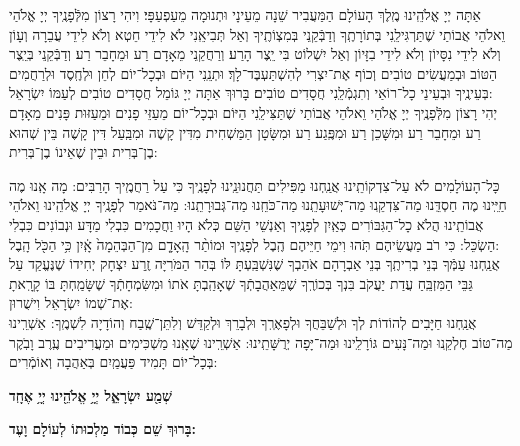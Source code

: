 \documentclass[twoside, openany, parskip=half, 11pt]{book}
\begin{document}
אַתָּה יְיָ  אֱלֹהֵֽינוּ מֶֽלֶךְ הָעוֹלָם הַמַּעֲבִיר שֵׁנָה מֵעֵינָי וּתְנוּמָה מֵעַפְעַפָּי׃ וִיהִי רָצוֹן מִלְּֿפָנֶֽיךָ יְיָ אֱלֹהַי וֵאלֹהֵי אֲבוֹתַי שֶׁתַּרְגִּילֵֽנִי בְּתוֹרָתֶֽךָ וְדַבְּֿקֵֽנִי בְּמִצְוֹתֶֽיךָ וְאַל תְּבִיאֵֽנִי לֹא לִידֵי חֵטְא וְלֹא לִידֵי עֲבֵרָה וְעָוֹן וְלֹא לִידֵי נִסָּיוֹן וְלֹא לִידֵי בִזָּיוֹן וְאַל יִשְׁלוֹט בִּי יֵֽצֶר הָרַע׃ וְרַחֲקֵֽנִי מֵאָדָם רַע וּמֵחָבֵר רַע׃ וְדַבְּֿקֵֽנִי בְּיֵֽצֶר הַטּוֹב וּבְמַעֲשִׂים טוֹבִים וְכוֹף אֶת־יִצְרִי לְהִשְׁתַּעְבֶּד־לָךְ׃ וּתְנֵֽנִי הַיּוֹם וּבְכָל־יוֹם לְחֵן וּלְחֶֽסֶד וּלְרַחֲמִים בְּעֵינֶֽיךָ וּבְעֵינֵי כָל־רוֹאַי וְתִגְמְֿלֵֽנִי חֲסָדִים טוֹבִים׃ בָּרוּךְ אַתָּה יְיָ  גּוֹמֵל חֲסָדִים טוֹבִים לְעַמּוֹ יִשְׂרָאֵל:\\
יְהִי רָצוֹן מִלְּֿפָנֶֽיךָ יְיָ אֱלֹהַי וֵאלֹהֵי אֲבוֹתַי שֶׁתַּצִּילֵֽנִי הַיּוֹם וּבְכָל־יוֹם מֵעַזֵּי פָנִים וּמֵעַזּוּת פָּנִים מֵאָדָם רַע וּמֵחָבֵר רַע וּמִשָּׁכֵן רַע וּמִפֶּֽגַע רַע וּמִשָּׂטָן הַמַּשְׁחִית מִדִּין קָשֶׁה וּמִבַּֽעַל דִּין קָשֶׁה בֵּין שְׁהוּא בֶן־בְּרִית וּבֵין שֶׁאֵינוֹ בֶן־בְּרִית:

כָּל־הָעוֹלָמִים לֹא עַל־צִדְקוֹתֵֽינוּ אֲנַֽחְנוּ מַפִּילִים תַּחֲנוּנֵֽינוּ לְפָנֶֽיךָ כִּי עַל רַחֲמֶֽיךָ הָרַבִּים: מָה אָֽנוּ מֶה חַיֵּֽינוּ מֶה חַסְדֵּֽנוּ מַה־צִּדְקֵֽנוּ מַה־יְּשׁוּעָתֵֽנוּ מַה־כֹּחֵֽנוּ מַה־גְּבוּרָתֵֽנוּ: מַה־נֹּאמַר לְפָנֶֽיךָ יְיָ אֱלֹהֵֽינוּ וֵאלֹהֵי אֲבוֹתֵֽינוּ הֲלֹא כָל־הַגִּבּוֹרִים כְּאַֽיִן לְפָנֶֽיךָ וְאַנְשֵׁי הַשֵּׁם כְּלֹא הָיוּ וַחֲכָמִים כִּבְלִי מַדָּע וּנְבוֹנִים כִּבְלִי הַשְׂכֵּל: כִּי רֹב מַעֲשֵׂיהֶם תֹּֽהוּ וִימֵי חַיֵּיהֶם הֶֽבֶל לְפָנֶֽיךָ וּמוֹתַ֨ר הָֽאָדָ֤ם מִן־הַבְּהֵמָה֙ אָֽ֔יִן כִּ֥י הַכֹּ֖ל הָֽבֶל: \\
אֲנַֽחְנוּ עַמְּֿךָ בְּנֵי בְרִיתֶֽךָ בְּנֵי אַבְרָהָם אֹהַבְךָ שֶׁנִּשְׁבַּֽעְתָּ לּוֹ בְּהַר הַמֹּרִיָּה זֶֽרַע יִצְחָק יְחִידוֹ שֶׁנֶּעֱקַד עַל גַּבֵּי הַמִּזְבֵּֽחַ עֲדַת יַעֲקֹב בִּנְךָ בְּכוֹרֶֽךָ שֶׁמֵּאַהֲבָתְֿךָ שֶׁאָהַֽבְתָּ אֹתוֹ וּמִשִּׂמְחָתְֿךָ שֶׁשָּׂמַֽחְתָּ בּוֹ קָרָֽאתָ אֶת־שְׁמוֹ יִשְׂרָאֵל וִישֻׁרוּן: \\ 
אֲנַֽחְנוּ חַיָּבִים לְהוֹדוֹת לְךָ וּלְשַׁבֵּחֲךָ וּלְפָאֶרְֽךָ וּלְבָרֵךְ וּלְקַדֵּשׁ וְלִתֵּן־שֶֽׁבַח וְהוֹדָיָה לִשְׁמֶֽךָ: אַשְׁרֵֽינוּ מַה־טּוֹב חֶלְקֵֽנוּ וּמַה־נָּעִים גּוֹרָלֵֽינוּ וּמַה־יָּפָה יְרֻשָּׁתֵֽינוּ: אַשְׁרֵֽינוּ שֶׁאָֽנוּ מַשְׁכִּימִים וּמַעֲרִיבִים עֶֽרֶב וָבֹֽקֶר בְּכָל־יוֹם תָּמִיד פַּעֲמַֽיִם בְּאַהֲבָה וְאוֹמְֿרִים:

\begin{Large}
\textbf{שְׁמַ֖ע יִשְׂרָאֵ֑ל יְיָ֥ אֱלֹהֵ֖ינוּ יְיָ֥ אֶחָֽד}
\end{Large}

\textbf{%
בָּרוּךְ שֵׁם כְּבוֹד מַלְכוּתוֹ לְעוֹלָם וָעֶד:
}
\end{document}
